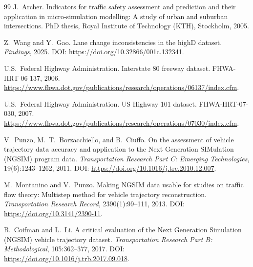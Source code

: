 \documentclass[12pt,a4paper,twoside,openright]{report}
\begin{document}
\begin{thebibliography}{99}
        J.~Archer.
        \newblock Indicators for traffic safety assessment and prediction and their application in micro-simulation modelling: A study of urban and suburban intersections.
        \newblock PhD thesis, Royal Institute of Technology (KTH), Stockholm, 2005.

        Z.~Wang and Y.~Gao.
        \newblock Lane change inconsistencies in the highD dataset.
        \newblock \emph{Findings}, 2025.
        \newblock DOI: \url{https://doi.org/10.32866/001c.132341}.

        U.S.~Federal Highway Administration.
        \newblock Interstate 80 freeway dataset.
        \newblock FHWA-HRT-06-137, 2006.
        \newblock \url{https://www.fhwa.dot.gov/publications/research/operations/06137/index.cfm}.

        U.S.~Federal Highway Administration.
        \newblock US Highway 101 dataset.
        \newblock FHWA-HRT-07-030, 2007.
        \newblock \url{https://www.fhwa.dot.gov/publications/research/operations/07030/index.cfm}.

        V.~Punzo, M.~T.~Borzacchiello, and B.~Ciuffo.
        \newblock On the assessment of vehicle trajectory data accuracy and application to the Next Generation SIMulation (NGSIM) program data.
        \newblock \emph{Transportation Research Part C: Emerging Technologies}, 19(6):1243--1262, 2011.
        \newblock DOI: \url{https://doi.org/10.1016/j.trc.2010.12.007}.

        M.~Montanino and V.~Punzo.
        \newblock Making NGSIM data usable for studies on traffic flow theory: Multistep method for vehicle trajectory reconstruction.
        \newblock \emph{Transportation Research Record}, 2390(1):99--111, 2013.
        \newblock DOI: \url{https://doi.org/10.3141/2390-11}.

        B.~Coifman and L.~Li.
        \newblock A critical evaluation of the Next Generation Simulation (NGSIM) vehicle trajectory dataset.
        \newblock \emph{Transportation Research Part B: Methodological}, 105:362--377, 2017.
        \newblock DOI: \url{https://doi.org/10.1016/j.trb.2017.09.018}.

    \end{thebibliography}

    \appendix
    \cleardoublepage
\end{document}
